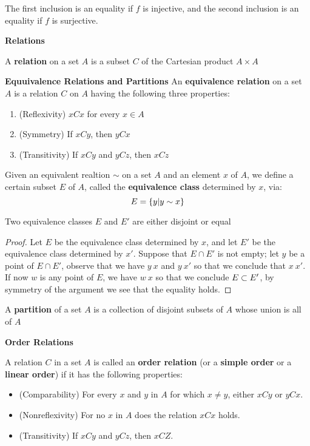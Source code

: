 The first inclusion is an equality if $f$ is injective, and the second inclusion is an equality if $f$ is surjective.

\textbf{Relations}

\begin{defn}
	A \textbf{relation} on a set $A$ is a subset $C$ of the Cartesian product $A \times A$ 
\end{defn}

\textbf{Equuivalence Relations and Partitions}
An \textbf{equivalence relation} on a set $A$ is a relation $C$ on $A$ having the following three properties:
\begin{enumerate}
	\item (Reflexivity) $xCx$ for every $ x \in A $
	\item (Symmetry) If $ xCy $, then $ yCx $ 
	\item (Transitivity) If $ xCy $ and $ yCz $, then $ xCz $
\end{enumerate}  

Given an equivalent realtion $ \sim $ on a set $A$ and an element $x$ of $A$, we define a certain subset $E$ of $A$, called the \textbf{equivalence class} determined by $x$, via:
\[ E = \left\lbrace y | y \sim x \right\rbrace \]

\begin{lem}
	Two equivalence classes $E$ and $E'$ are either disjoint or equal
\end{lem}

\begin{proof}
	Let $E$ be the equivalence class determined by $x$, and let $E'$ be the equivalence class determined by $x'$. Suppose that $ E \cap E'$ is not empty; let $y$ be a point of $ E \cap E'$, observe that we have $ y ~ x $ and $ y ~ x'$ so  that we conclude that $ x ~ x'$. If now $w$ is any point of $E$, we have $w ~ x$ so that we conclude $E \subset E'$, by symmetry of the argument we see that the equality holds.
\end{proof}

\begin{defn}
	A \textbf{partition} of a set $A$ is a collection of disjoint subsets of $A$ whose union is all of $A$
\end{defn}

\textbf{Order Relations}

A relation $C$ in a set $A$ is called an \textbf{order relation} (or a \textbf{simple order} or a \textbf{linear order}) if it has the following properties:

\begin{itemize}
	\item (Comparability) For every $x$ and $y$ in $A$ for which $ x \neq y$, either $ xCy$ or $yCx$.
	\item (Nonreflexivity) For no $x$ in $A$ does the relation $xCx$ holds.
	\item (Transitivity) If $xCy$ and $yCz$, then $xCZ$.
\end{itemize}

